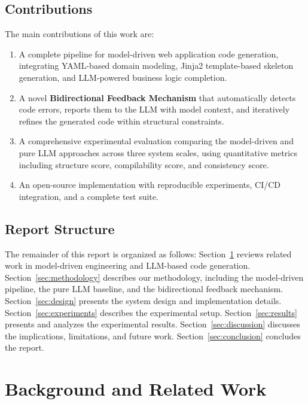 \documentclass[11pt,a4paper]{article}
\begin{document}
\subsection{Contributions}

The main contributions of this work are:

\begin{enumerate}[leftmargin=*]
    \item A complete pipeline for model-driven web application code generation, integrating YAML-based domain modeling, Jinja2 template-based skeleton generation, and LLM-powered business logic completion.
    \item A novel \textbf{Bidirectional Feedback Mechanism} that automatically detects code errors, reports them to the LLM with model context, and iteratively refines the generated code within structural constraints.
    \item A comprehensive experimental evaluation comparing the model-driven and pure LLM approaches across three system scales, using quantitative metrics including structure score, compilability score, and consistency score.
    \item An open-source implementation with reproducible experiments, CI/CD integration, and a complete test suite.
\end{enumerate}

\subsection{Report Structure}

The remainder of this report is organized as follows: Section~\ref{sec:background} reviews related work in model-driven engineering and LLM-based code generation. Section~\ref{sec:methodology} describes our methodology, including the model-driven pipeline, the pure LLM baseline, and the bidirectional feedback mechanism. Section~\ref{sec:design} presents the system design and implementation details. Section~\ref{sec:experiments} describes the experimental setup. Section~\ref{sec:results} presents and analyzes the experimental results. Section~\ref{sec:discussion} discusses the implications, limitations, and future work. Section~\ref{sec:conclusion} concludes the report.

\newpage
\section{Background and Related Work}
\label{sec:background}
\end{document}
